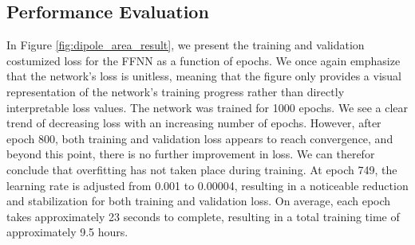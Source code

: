 \documentclass[a4paper, UKenglish, 11pt]{uiomaster}
\begin{document}



\subsection{Performance Evaluation}

In Figure \ref{fig:dipole_area_result}, we present the training and validation costumized loss for the FFNN as a function of epochs. We once again emphasize that the network's loss is unitless, meaning that the figure only provides a visual representation of the network's training progress rather than directly interpretable loss values. The network was trained for 1000 epochs. We see a clear trend of decreasing loss with an increasing number of epochs. However, after epoch 800, both training and validation loss appears to reach convergence, and beyond this point, there is no further improvement in loss. We can therefor conclude that overfitting has not taken place during training. At epoch 749, the learning rate is adjusted from 0.001 to 0.00004, resulting in a noticeable reduction and stabilization for both training and validation loss. On average, each epoch takes approximately 23 seconds to complete, resulting in a total training time of approximately 9.5 hours.
\end{document}
